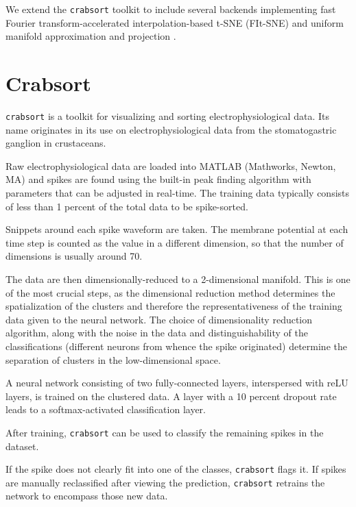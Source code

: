 \documentclass{article}
\begin{document}
We extend the \texttt{crabsort} toolkit to include several backends implementing
fast Fourier transform-accelerated interpolation-based t-SNE (FIt-SNE) \autocite{lindermanFastInterpolationbasedTSNE2019, vandermaatenAcceleratingTSNEUsing2014}
and uniform manifold approximation and projection \autocite{mcinnesUMAPUniformManifold2018}.

\section{Crabsort}

\texttt{crabsort} is a toolkit for visualizing and sorting electrophysiological data.
Its name originates in its use on electrophysiological data from the stomatogastric ganglion in crustaceans.

Raw electrophysiological data are loaded into MATLAB (Mathworks, Newton, MA) and spikes are found using the built-in peak finding algorithm
with parameters that can be adjusted in real-time.
The training data typically consists of less than 1 percent of the total data to be spike-sorted.

Snippets around each spike waveform are taken.
The membrane potential at each time step is counted as the value in a different dimension,
so that the number of dimensions is usually around 70.

The data are then dimensionally-reduced to a 2-dimensional manifold.
This is one of the most crucial steps, as the dimensional reduction method determines the spatialization of the clusters
and therefore the representativeness of the training data given to the neural network.
The choice of dimensionality reduction algorithm, along with the noise in the data
and distinguishability of the classifications (different neurons from whence the spike originated)
determine the separation of clusters in the low-dimensional space.

A neural network consisting of two fully-connected layers, interspersed with reLU layers,
is trained on the clustered data.
A layer with a 10 percent dropout rate leads to a softmax-activated classification layer.

After training, \texttt{crabsort} can be used to classify the remaining spikes in the dataset.

If the spike does not clearly fit into one of the classes, \texttt{crabsort} flags it.
If spikes are manually reclassified after viewing the prediction, \texttt{crabsort} retrains the network to encompass those new data.
\end{document}
